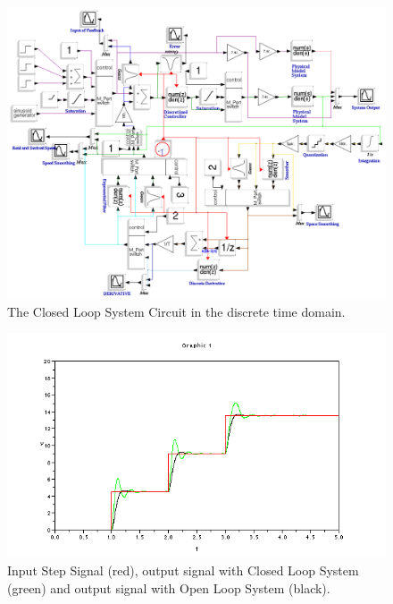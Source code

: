 \begin{figure}[htbp]
  \begin{center}
  \includegraphics[scale=0.50, angle=90]{FIGURES_2/ScicosDigitalCircuit.png} 
    \caption[Discrete time model]{The Closed Loop System Circuit in the discrete time domain.}
    \label{fig:DigitalCircuit}
  \end{center}
\end{figure}

\begin{figure}[H]
  \begin{center}
  \includegraphics[scale=0.5]{FIGURES_2/CLS-Output-Digital.png}
    \caption[Simulation in Discrete time]{Input Step Signal (red), output signal with Closed Loop System (green) and output signal with Open Loop System (black).}
    \label{fig:digitalOutput}
  \end{center}
\end{figure}

